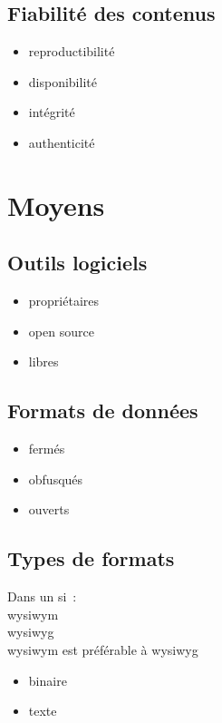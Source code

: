\documentclass[12pt]{extarticle}
\begin{document}
\subsection{Fiabilité des contenus}
\begin{itemize}
\item{reproductibilité}
\item{disponibilité}
\item{intégrité}
\item{authenticité}
\end{itemize}

\pagebreak
\section{Moyens}

\subsection{Outils logiciels}
\begin{itemize}
\item{propriétaires}
\item{open source}
\item{libres}
\end{itemize}

\subsection{Formats de données}
\begin{itemize}
\item{fermés}
\item{obfusqués}
\item{ouverts}
\end{itemize}

\pagebreak
\subsection{Types de formats}
Dans un \gls{si} :\\
\gls{wysiwym} \cite{wysiwym}\\
\gls{wysiwyg} \cite{wysiwyg}\\
\gls{wysiwym} est préférable à \gls{wysiwyg}

\begin{itemize}
\item{binaire}
\item{texte}
\end{itemize}
\end{document}
